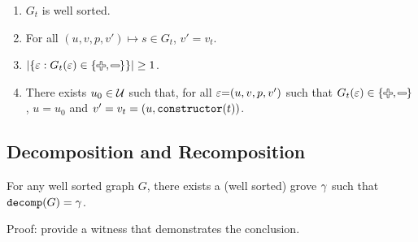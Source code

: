 \begin{definition}
\begin{itemize}
      \begin{enumerate}
        \item $G_t$ is well sorted.
        \item For all $(u, v, p, v') \mapsto s \in G_t$, $v' = v_t$.
        \item $\SizeOf{\SetOf{\e \SuchThat{G_t(\e) \in \SetOf{\Plus, \Minus}}}} \geq 1$.
        \item
          There exists $u_0 \in \mathcal{U}$ such that,
          for all $\varepsilon{=}(u, v, p, v')$ such that $G_t(\e) \in \SetOf{\Plus, \Minus}$,
          $u = u_0$ and $v' = v_t = (u, \operatorname{\texttt{constructor}}\mathopen{}\left(t\right)\mathclose{})$.
      \end{enumerate}
  \end{itemize}
\end{definition}


\subsection{Decomposition and Recomposition}

\begin{theorem}
  For any well sorted graph $G$,
  there exists a (well sorted) grove $\gamma$
  such that $\operatorname{\texttt{decomp}}\mathopen{}\left(G\right)\mathclose{} = \gamma$.
\end{theorem}

Proof: provide a witness that demonstrates the conclusion.



\figureDecompositionDefHelpersContent


